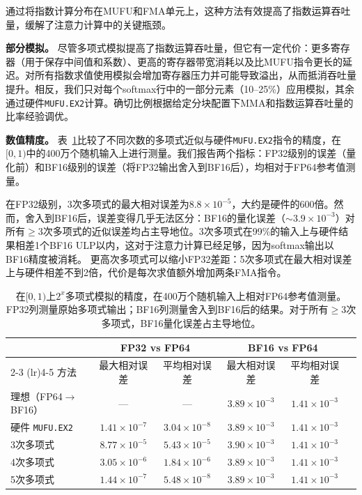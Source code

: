 通过将指数计算分布在MUFU和FMA单元上，这种方法有效提高了指数运算吞吐量，缓解了注意力计算中的关键瓶颈。

\textbf{部分模拟。}
尽管多项式模拟提高了指数运算吞吐量，但它有一定代价：更多寄存器（用于保存中间值和系数）、更高的寄存器带宽消耗以及比MUFU指令更长的延迟。对所有指数求值使用模拟会增加寄存器压力并可能导致溢出，从而抵消吞吐量提升。相反，我们只对每个softmax行中的一部分元素（10--25\%）应用模拟，其余通过硬件\texttt{MUFU.EX2}计算。确切比例根据给定分块配置下MMA和指数运算吞吐量的比率经验调优。

\textbf{数值精度。}
表~\ref{tab:ex2_accuracy}比较了不同次数的多项式近似与硬件\texttt{MUFU.EX2}指令的精度，在$[0, 1)$中的400万个随机输入上进行测量。我们报告两个指标：FP32级别的误差（量化前）和BF16级别的误差（将FP32输出舍入到BF16后），均相对于FP64参考值测量。

在FP32级别，3次多项式的最大相对误差为$8.8 \times 10^{-5}$，大约是硬件的600倍。然而，舍入到BF16后，误差变得几乎无法区分：BF16的量化误差（${\sim}3.9 \times 10^{-3}$）对所有$\geq 3$次多项式的近似误差均占主导地位。3次多项式在99\%的输入上与硬件结果相差1个BF16 ULP以内，这对于注意力计算已经足够，因为softmax输出以BF16精度被消耗。
更高次多项式可以缩小FP32差距：5次多项式在最大相对误差上与硬件相差不到2倍，代价是每次求值额外增加两条FMA指令。

\begin{table}[t]
\centering
\small
\begin{tabular}{lccccc}
\toprule
& \multicolumn{2}{c}{FP32 vs FP64} & \multicolumn{2}{c}{BF16 vs FP64} \\
\cmidrule(lr){2-3} \cmidrule(lr){4-5}
方法 & 最大相对误差 & 平均相对误差 & 最大相对误差 & 平均相对误差 \\
\midrule
理想（FP64$\to$BF16）& --- & --- & $3.89 \times 10^{-3}$ & $1.41 \times 10^{-3}$ \\
硬件 \texttt{MUFU.EX2} & $1.41 \times 10^{-7}$ & $3.04 \times 10^{-8}$ & $3.89 \times 10^{-3}$ & $1.41 \times 10^{-3}$ \\
3次多项式 & $8.77 \times 10^{-5}$ & $5.43 \times 10^{-5}$ & $3.90 \times 10^{-3}$ & $1.41 \times 10^{-3}$ \\
4次多项式 & $3.05 \times 10^{-6}$ & $1.84 \times 10^{-6}$ & $3.89 \times 10^{-3}$ & $1.41 \times 10^{-3}$ \\
5次多项式 & $1.44 \times 10^{-7}$ & $5.48 \times 10^{-8}$ & $3.89 \times 10^{-3}$ & $1.41 \times 10^{-3}$ \\
\bottomrule
\end{tabular}
\caption{在$[0, 1)$上$2^x$多项式模拟的精度，在400万个随机输入上相对FP64参考值测量。FP32列测量原始多项式输出；BF16列测量舍入到BF16后的结果。对于所有$\geq 3$次多项式，BF16量化误差占主导地位。}
\label{tab:ex2_accuracy}
\end{table}


